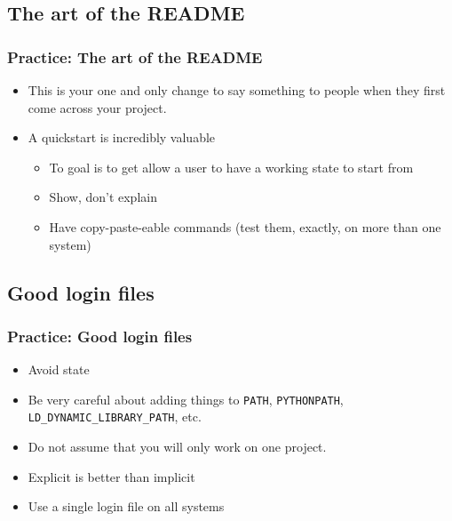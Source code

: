 \documentclass{beamer}
\begin{document}
\subsection{The art of the README}
\begin{frame}[fragile]
\frametitle{Practice: The art of the README}
  \begin{itemize}
    \item This is your one and only change to say something to people when they first come across your project.
    \item A quickstart is incredibly valuable
      \begin{itemize}
        \item To goal is to get allow a user to have a working state to start from
        \item Show, don't explain
        \item Have copy-paste-eable commands (test them, exactly, on more than one system)
      \end{itemize}
    \end{itemize}
\end{frame}

\subsection{Good login files}
\begin{frame}[fragile]
\frametitle{Practice: Good login files}
\begin{itemize}
  \item Avoid state
  \item Be very careful about adding things to \lstinline{PATH}, \lstinline{PYTHONPATH}, \lstinline{LD_DYNAMIC_LIBRARY_PATH}, etc.
  \item Do not assume that you will only work on one project.
  \item Explicit is better than implicit
  \item Use a single login file on all systems
\end{itemize}
\end{frame}

\end{document}
